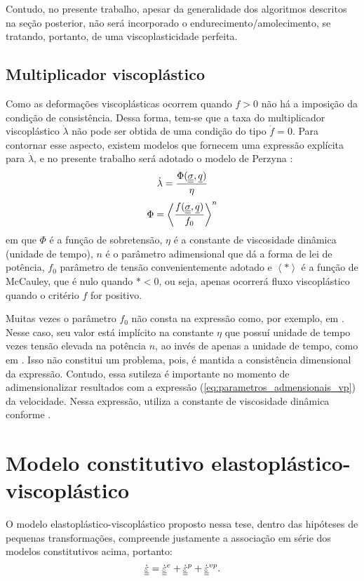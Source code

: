 Contudo, no presente trabalho, apesar da generalidade dos algoritmos descritos na seção posterior, não será incorporado o endurecimento/amolecimento, se tratando, portanto, de uma viscoplasticidade perfeita.

\subsection{Multiplicador viscoplástico}
Como as deformações viscoplásticas ocorrem quando $f>0$ não há a imposição da condição de consistência. Dessa forma, tem-se que a taxa do multiplicador viscoplástico $\dot \lambda$ não pode ser obtida de uma condição do tipo $\dot f = 0$. Para contornar esse aspecto, existem modelos que fornecem uma expressão explícita para $\dot \lambda$, e no presente trabalho será adotado o modelo de Perzyna \cite[p. 823]{Zienkiewicz1974}:
\begin{equation}
	\label{eq:lambdavp}
	\dot \lambda = \dfrac{\Phi(\underline{\underline \sigma},\underline q)}{\eta}
\end{equation}
\begin{equation}
	\label{eq:sobretensao}
	\Phi = \left\langle  \dfrac{f(\underline{\underline \sigma},\underline q)}{f_0} \right\rangle^n
\end{equation}
em que $\Phi$ é a função de sobretensão, $\eta$ é a constante de viscosidade dinâmica (unidade de tempo), $n$ é o parâmetro adimensional que dá a forma de lei de potência, $f_0$ parâmetro de tensão convenientemente adotado e $\left\langle * \right\rangle$ é a função de McCauley, que é nulo quando $*<0$, ou seja, apenas ocorrerá fluxo viscoplástico quando o critério $f$ for positivo.  

Muitas vezes o parâmetro $f_0$ não consta na expressão como, por exemplo, em . Nesse caso, seu valor está implícito na constante $\eta$ que possuí unidade de tempo vezes tensão elevada na potência $n$, ao invés de apenas a unidade de tempo, como em . Isso não constitui um problema, pois, é mantida a consistência dimensional da expressão. Contudo, essa sutileza é importante no momento de adimensionalizar resultados com a expressão (\ref{eq:parametros_admensionais_vp}) da velocidade. Nessa expressão,  utiliza a constante de viscosidade dinâmica conforme .

\section{Modelo constitutivo elastoplástico-viscoplástico}
O modelo elastoplástico-viscoplástico proposto nessa tese, dentro das hipóteses de pequenas transformações, compreende justamente a associação em série dos modelos constitutivos acima, portanto:
\begin{equation}
	\label{eq:decomposicao_deformacoes_epvp}
	\dot {\underline{\underline \varepsilon}} = \dot {\underline{\underline \varepsilon}}^e + \dot {\underline{\underline \varepsilon}}^{p} + \dot {\underline{\underline \varepsilon}}^{vp}.
\end{equation}


